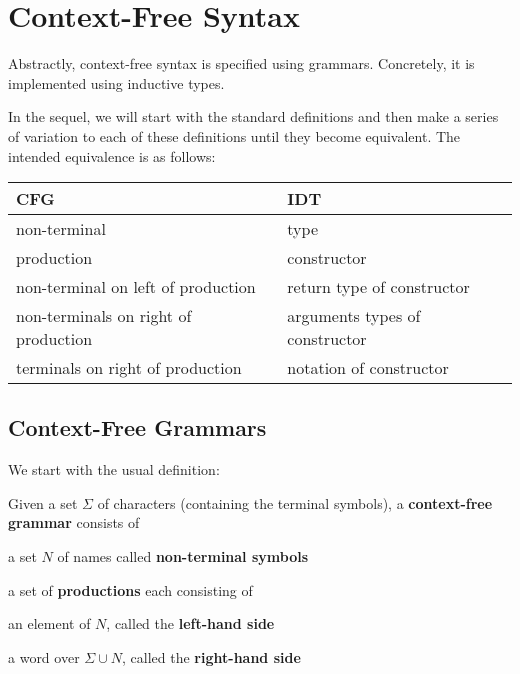 \section{Context-Free Syntax}

Abstractly, context-free syntax is specified using grammars.
Concretely, it is implemented using inductive types.

In the sequel, we will start with the standard definitions and then make a series of variation to each of these definitions until they become equivalent.
The intended equivalence is as follows:
\begin{center}
\begin{tabular}{l|l}
CFG & IDT \\
\hline
non-terminal & type \\
production & constructor \\
non-terminal on left of production & return type of constructor \\
non-terminals on right of production & arguments types of constructor \\
terminals on right of production & notation of constructor
\end{tabular}
\end{center}

\subsection{Context-Free Grammars}

We start with the usual definition:

\begin{definition}
Given a set $\Sigma$ of characters (containing the terminal symbols), a \textbf{context-free grammar} consists of
\begin{compactitem}
\item a set $N$ of names called \textbf{non-terminal symbols}
\item a set of \textbf{productions} each consisting of
 \begin{compactitem}
  \item an element of $N$, called the \textbf{left-hand side}
  \item a word over $\Sigma\cup N$, called the \textbf{right-hand side}
 \end{compactitem}
\end{compactitem}
\end{definition}

